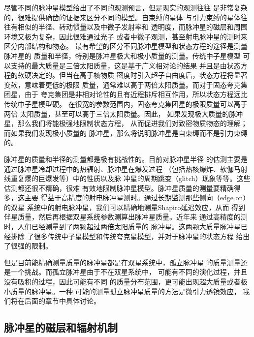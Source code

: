 尽管不同的脉冲星模型给出了不同的观测预言，但是现实的观测往往
是非常复杂的，很难提供确凿的证据来区分不同的模型。自束缚的星体
与引力束缚的星体往往有相似的半径、转动惯量以及中微子发射率和
透明度，而脉冲星的磁层和周围环境又极为复杂，因此很难通过光子
或者中微子观测，甚至射电脉冲星的测时来区分内部结构和物态。
最有希望的区分不同脉冲星模型和状态方程的途径是测量脉冲星的
质量和半径，特别是脉冲星极大和极小质量的测量。传统中子星模型
可以支持的最大质量是三倍太阳质量，这是基于广义相对论的结果
并且是由状态方程的软硬决定的\supercite{rr74}。但当在高于核物质
密度时引入超子自由度后，状态方程将显著变软，意味着更低的极限
质量，通常难以高于两倍太阳质量。而对于固态夸克集团星，由于
夸克集团是非相对论性的且有近程排斥相互作用，所以状态方程远比
传统中子星模型硬。
在很宽的参数范围内，固态夸克集团星的极限质量可以高于两倍
太阳质量，甚至可以高于三倍太阳质量\supercite{lgx13}。因此，
如果发现极大质量的脉冲星，那么我们将能极强地限制状态方程，
从而促进我们对致密物质物态的理解；而如果我们发现极小质量的
脉冲星，那么将说明脉冲星是自束缚而不是引力束缚的。

脉冲星的质量和半径的测量都是极有挑战性的。目前对脉冲星半径
的估测主要是通过脉冲星冷却过程中的热辐射、脉冲星在爆发过程
（包括热核爆炸、软伽马射线重复爆的巨爆发等）中的性质以及脉
冲星的周期跳变（glitch）现象等等。这些估测都还很不精确，很难
有效地限制脉冲星模型。脉冲星质量的测量要精确得多，这主要
得益于高精度的射电脉冲星测时。通过长期监测那些侧向（edge on）的双星
系统中的射电脉冲星，我们可以精确地测量Shapiro延迟效应，从而
得到伴星质量，然后再根据双星系统参数测算出脉冲星质量。近年来
通过高精度的测时，人们已经测量到了两颗超过两倍太阳质量的
脉冲星\supercite{Anton,Demorest}。这两颗大质量脉冲星已经排除
了很多传统中子星模型和传统夸克星模型，并对于脉冲星的状态方程
给出了很强的限制\supercite{Ozel2010,Lai2011}。

但是目前能精确测量质量的脉冲星都是在双星系统中，孤立脉冲星
的质量测量还是一个挑战。而孤立脉冲星由于不在双星系统中，
可能有不同的演化过程，并且没有吸积的过程，因此可能有不同
的质量分布范围，更可能出现超大质量或者极小质量的脉冲星。一种
可能的测量孤立脉冲星质量的方法是微引力透镜效应\supercite{Dai,dsl+15}，
我们将在后面的章节中具体讨论。

\subsection{脉冲星的磁层和辐射机制}

